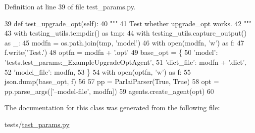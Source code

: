 Definition at line 39 of file test\+\_\+params.\+py.


\begin{DoxyCode}
39     \textcolor{keyword}{def }test\_upgrade\_opt(self):
40         \textcolor{stringliteral}{"""}
41 \textcolor{stringliteral}{        Test whether upgrade\_opt works.}
42 \textcolor{stringliteral}{        """}
43         with testing\_utils.tempdir() \textcolor{keyword}{as} tmp:
44             with testing\_utils.capture\_output() \textcolor{keyword}{as} \_:
45                 modfn = os.path.join(tmp, \textcolor{stringliteral}{'model'})
46                 with open(modfn, \textcolor{stringliteral}{'w'}) \textcolor{keyword}{as} f:
47                     f.write(\textcolor{stringliteral}{'Test.'})
48                 optfn = modfn + \textcolor{stringliteral}{'.opt'}
49                 base\_opt = \{
50                     \textcolor{stringliteral}{'model'}: \textcolor{stringliteral}{'tests.test\_params:\_ExampleUpgradeOptAgent'},
51                     \textcolor{stringliteral}{'dict\_file'}: modfn + \textcolor{stringliteral}{'.dict'},
52                     \textcolor{stringliteral}{'model\_file'}: modfn,
53                 \}
54                 with open(optfn, \textcolor{stringliteral}{'w'}) \textcolor{keyword}{as} f:
55                     json.dump(base\_opt, f)
56 
57                 pp = ParlaiParser(\textcolor{keyword}{True}, \textcolor{keyword}{True})
58                 opt = pp.parse\_args([\textcolor{stringliteral}{'--model-file'}, modfn])
59                 agents.create\_agent(opt)
60 
\end{DoxyCode}


The documentation for this class was generated from the following file\+:\begin{DoxyCompactItemize}
\item 
tests/\hyperlink{test__params_8py}{test\+\_\+params.\+py}\end{DoxyCompactItemize}
